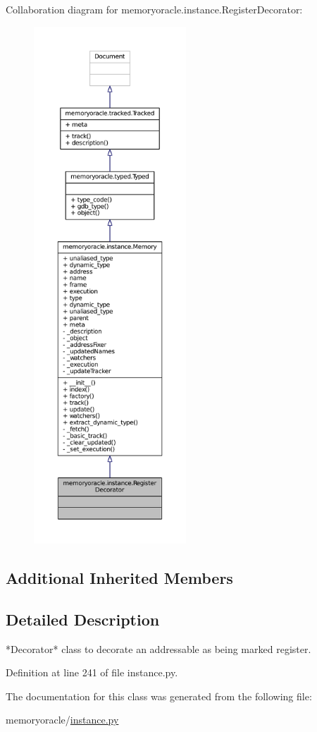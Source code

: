 Collaboration diagram for memoryoracle.\+instance.\+Register\+Decorator\+:
\nopagebreak
\begin{figure}[H]
\begin{center}
\leavevmode
\includegraphics[height=550pt]{classmemoryoracle_1_1instance_1_1RegisterDecorator__coll__graph}
\end{center}
\end{figure}
\subsection*{Additional Inherited Members}


\subsection{Detailed Description}
\begin{DoxyVerb}*Decorator* class to decorate an addressable as being marked register.
\end{DoxyVerb}
 

Definition at line 241 of file instance.\+py.



The documentation for this class was generated from the following file\+:\begin{DoxyCompactItemize}
\item 
memoryoracle/\hyperlink{instance_8py}{instance.\+py}\end{DoxyCompactItemize}
